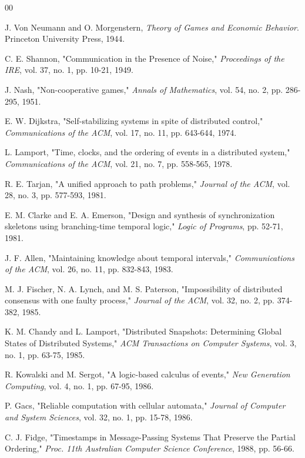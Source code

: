 \documentclass[conference]{IEEEtran}
\begin{document}
\begin{thebibliography}{00}

 J. Von Neumann and O. Morgenstern, \textit{Theory of Games and Economic Behavior}. Princeton University Press, 1944.

 C. E. Shannon, "Communication in the Presence of Noise," \textit{Proceedings of the IRE}, vol. 37, no. 1, pp. 10-21, 1949.

 J. Nash, "Non-cooperative games," \textit{Annals of Mathematics}, vol. 54, no. 2, pp. 286-295, 1951.

 E. W. Dijkstra, "Self-stabilizing systems in spite of distributed control," \textit{Communications of the ACM}, vol. 17, no. 11, pp. 643-644, 1974.

 L. Lamport, "Time, clocks, and the ordering of events in a distributed system," \textit{Communications of the ACM}, vol. 21, no. 7, pp. 558-565, 1978.

 R. E. Tarjan, "A unified approach to path problems," \textit{Journal of the ACM}, vol. 28, no. 3, pp. 577-593, 1981.

 E. M. Clarke and E. A. Emerson, "Design and synthesis of synchronization skeletons using branching-time temporal logic," \textit{Logic of Programs}, pp. 52-71, 1981.

 J. F. Allen, "Maintaining knowledge about temporal intervals," \textit{Communications of the ACM}, vol. 26, no. 11, pp. 832-843, 1983.

 M. J. Fischer, N. A. Lynch, and M. S. Paterson, "Impossibility of distributed consensus with one faulty process," \textit{Journal of the ACM}, vol. 32, no. 2, pp. 374-382, 1985.

 K. M. Chandy and L. Lamport, "Distributed Snapshots: Determining Global States of Distributed Systems," \textit{ACM Transactions on Computer Systems}, vol. 3, no. 1, pp. 63-75, 1985.

 R. Kowalski and M. Sergot, "A logic-based calculus of events," \textit{New Generation Computing}, vol. 4, no. 1, pp. 67-95, 1986.

 P. Gacs, "Reliable computation with cellular automata," \textit{Journal of Computer and System Sciences}, vol. 32, no. 1, pp. 15-78, 1986.

 C. J. Fidge, "Timestamps in Message-Passing Systems That Preserve the Partial Ordering," \textit{Proc. 11th Australian Computer Science Conference}, 1988, pp. 56-66.


\end{thebibliography}
\end{document}

